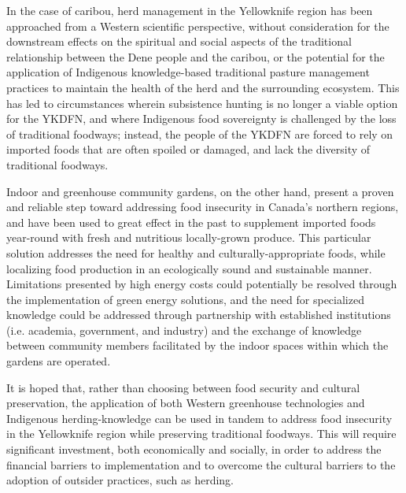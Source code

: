 \documentclass{report}
\begin{document}
\hspace{24pt} In the case of caribou, herd management in the Yellowknife region has been approached from a Western scientific perspective, without consideration for the downstream effects on the spiritual and social aspects of the traditional relationship between the Dene people and the caribou, or the potential for the application of Indigenous knowledge-based traditional pasture management practices to maintain the health of the herd and the surrounding ecosystem.
This has led to circumstances wherein subsistence hunting is no longer a viable option for the YKDFN, and where Indigenous food sovereignty is challenged by the loss of traditional foodways; instead, the people of the YKDFN are forced to rely on imported foods that are often spoiled or damaged, and lack the diversity of traditional foodways.

\hspace{24pt} Indoor and greenhouse community gardens, on the other hand, present a proven and reliable step toward addressing food insecurity in Canada's northern regions, and have been used to great effect in the past to supplement imported foods year-round with fresh and nutritious locally-grown produce. This particular solution addresses the need for healthy and culturally-appropriate foods, while localizing food production in an ecologically sound and sustainable manner. Limitations presented by high energy costs could potentially be resolved through the implementation of green energy solutions, and the need for specialized knowledge could be addressed through partnership with established institutions (i.e. academia, government, and industry) and the exchange of knowledge between community members facilitated by the indoor spaces within which the gardens are operated.

\hspace{24pt} It is hoped that, rather than choosing between food security and cultural preservation, the application of both Western greenhouse technologies and Indigenous herding-knowledge can be used in tandem to address food insecurity in the Yellowknife region while preserving traditional foodways. This will require significant investment, both economically and socially, in order to address the financial barriers to implementation and to overcome the cultural barriers to the adoption of outsider practices, such as herding.

\clearpage

\printbibliography[heading=bibintoc]
\end{document}
